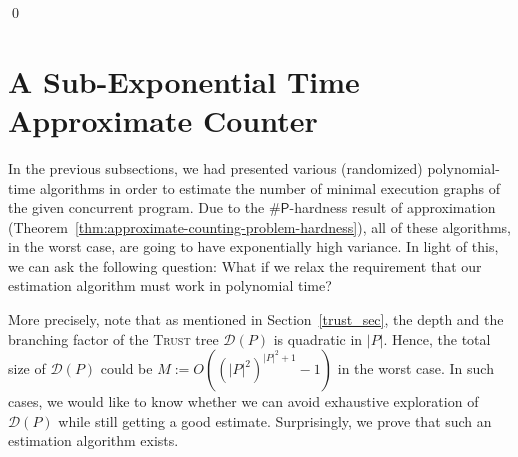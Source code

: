 \documentclass[acmsmall]{acmart}
\newcommand{\trust}{\textsc{Trust}\xspace}
\newcommand{\init}{\mathsf{init}}
\newcommand{\sharpP}{\#\mathsf{P}}
\begin{document}
\begin{tcolorbox}[
    colback=SkyBlue!5,
    colframe=blue!20,
    boxrule=1pt,
    arc=2pt,
    width=\textwidth,
    boxsep=5pt,
    left=5pt,
    right=5pt,
    top=5pt,
    bottom=5pt
]

\qed
\end{tcolorbox}




\section{A Sub-Exponential Time Approximate Counter}

In the previous subsections, we had presented various (randomized) polynomial-time algorithms in order to estimate the number of minimal execution graphs of the given concurrent program. Due to the $\sharpP$-hardness result of approximation (Theorem~\ref{thm:approximate-counting-problem-hardness}), all
of these algorithms, in the worst case, are going to have exponentially high variance.
In light of this, we can ask the following question: 
What if we relax the requirement that our estimation algorithm must work in polynomial time? 

More precisely, note that as mentioned in Section~\ref{trust_sec}, the depth and the branching factor of the \trust tree $\mathcal{D}(P)$ is quadratic in $|P|$. Hence, the total size of $\mathcal{D}(P)$ could be $M := O((|P|^2)^{|P|^2+1} - 1)$ in the worst case. In such cases, we would like to know whether we can avoid exhaustive exploration of $\mathcal{D}(P)$ while still getting a good estimate.
Surprisingly, we prove that such an estimation algorithm exists.
\end{document}
